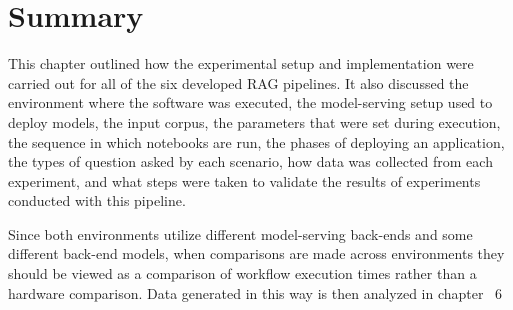 \section{Summary}

This chapter outlined how the experimental setup and implementation were carried out for all of the six developed \ac{RAG} pipelines. It also discussed the environment where the software was executed, the model-serving setup used to deploy models, the input corpus, the parameters that were set during execution, the sequence in which notebooks are run, the phases of deploying an application, the types of question asked by each scenario, how data was collected from each experiment, and what steps were taken to validate the results of experiments conducted with this pipeline.

Since both environments utilize different model-serving back-ends and some different back-end models, when comparisons are made across environments they should be viewed as a comparison of workflow execution times rather than a hardware comparison. Data generated in this way is then analyzed in chapter ~6